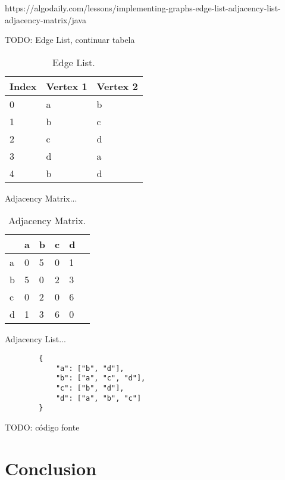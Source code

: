 \documentclass[a4paper]{article}
\begin{document}
    https://algodaily.com/lessons/implementing-graphs-edge-list-adjacency-list-adjacency-matrix/java
    

    TODO: Edge List, continuar tabela

    \begin{table}[H]
        \centering
        \caption{\label{tab:edge-list}Edge List.}
        \vspace*{10pt}
        \begin{tabular}{ |l|l|l| } 
            \hline
            Index & Vertex 1 & Vertex 2 \\
            \hline
            0   & a & b \\
            \hline
            1   & b & c \\
            \hline
            2   & c & d \\
            \hline
            3   & d & a \\
            \hline
            4   & b & d \\
            \hline            
        \end{tabular}
    \end{table}


    Adjacency Matrix...

        
    \begin{table}[H]
        \centering
        \caption{\label{tab:adjacency-matrix}Adjacency Matrix.}
        \vspace*{10pt}
        \begin{tabular}{ l|l|l|l|l|l| } 
                & a & b & c & d \\
            \hline
            a   & 0 & 5 & 0 & 1 \\
            b   & 5 & 0 & 2 & 3 \\
            c   & 0 & 2 & 0 & 6 \\
            d   & 1 & 3 & 6 & 0 \\
            \hline
        \end{tabular}
    \end{table}



    Adjacency List...

    \begin{verbatim}
        { 
            "a": ["b", "d"],
            "b": ["a", "c", "d"],
            "c": ["b", "d"],
            "d": ["a", "b", "c"]
        }
    \end{verbatim}


    TODO: código fonte

    \section*{Conclusion}

    
     
\end{document}
